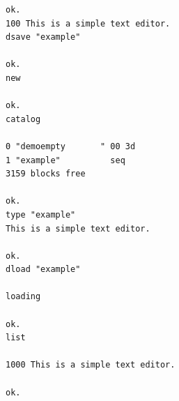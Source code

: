 \begin{description}[leftmargin=2cm,style=nextline]
\begin{tcolorbox}[colback=black,coltext=white]
\begin{verbatim}
ok.
100 This is a simple text editor.
dsave "example"

ok.
new

ok.
catalog

0 "demoempty       " 00 3d
1 "example"          seq
3159 blocks free

ok.
type "example"
This is a simple text editor.

ok.
dload "example"

loading

ok.
list

1000 This is a simple text editor.

ok.
\end{verbatim}
\end{tcolorbox}
\end{description}


\newpage
